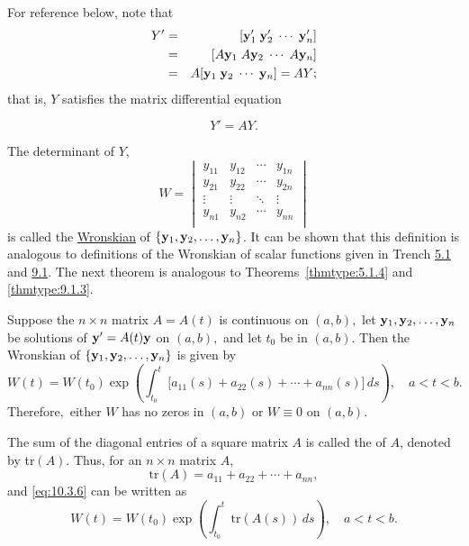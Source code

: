 \documentclass{ximera}
\begin{document}
For reference below, note that
\begin{eqnarray*}
Y'&=&[{\bf y}_1'\; {\bf y}_2'\; \cdots\; {\bf y}_n']\\
&=&[A{\bf y}_1\; A{\bf y}_2\; \cdots\; A{\bf y}_n]\\
&=&A[{\bf y}_1\; {\bf y}_2\; \cdots\; {\bf y}_n]=AY;
\end{eqnarray*}
that is, $Y$ satisfies the matrix differential equation

$$
Y'=AY.
$$

The determinant of $Y$,
\begin{equation} \label{eq:10.3.5}
W=\begin{vmatrix}
y_{11}&y_{12}&\cdots&y_{1n} \\
y_{21}&y_{22}&\cdots&y_{2n}\\
\vdots&\vdots&\ddots&\vdots \\
y_{n1}&y_{n2}&\cdots&y_{nn} \\
\end{vmatrix}
\end{equation}
is called the
\href{http://www-history.mcs.st-and.ac.uk/Mathematicians/Wronski.html}{Wronskian} of $\{{\bf y}_1,{\bf y}_2,\dots,{\bf
y}_n\}$. It can be shown 
that this definition is analogous to definitions of the Wronskian of
scalar functions given in Trench \href{https://ximera.osu.edu/ode/main/homogeneousLinearEquations/homogeneousLinearEquations}{5.1} and \href{https://ximera.osu.edu/ode/main/linearHigherOrder/linearHigherOrder}{9.1}.
The next theorem is analogous to
Theorems~\ref{thmtype:5.1.4} and
\ref{thmtype:9.1.3}. %

\begin{theorem} \label{thmtype:10.3.2}
Suppose the $n\times n$ matrix $A=A(t)$ is continuous on $(a,b),$ let
${\bf y}_1, {\bf y}_2, \dots, {\bf y}_n$ be solutions of ${\bf
y}'=A(t){\bf y}$ on $(a,b),$ and let $t_0$ be in $(a,b)$. Then the
Wronskian of $\{{\bf y}_1,{\bf y}_2,\dots,{\bf y}_n\}$ is given by
\begin{equation} \label{eq:10.3.6}
W(t)=W(t_0)\exp\left(
\int^t_{t_0}\big[a_{11}(s)+a_{22}(s)+\cdots+a_{nn}(s)]\,
ds\right), \quad  a < t < b.
\end{equation}
Therefore$,$  either $W$ has no zeros in  $(a,b)$ or $W\equiv0$
on  $(a,b).$
\end{theorem}

\begin{remark}
The sum of the diagonal entries of a square matrix $A$ is called the
 of $A$, denoted by tr$(A)$. Thus, for an $n\times n$
matrix $A$,
$$
\mbox{tr}(A)=a_{11}+a_{22}+\cdots+a_{nn},
$$
and  \eqref{eq:10.3.6} can be written as
$$
W(t)=W(t_0)\exp\left(
\int^t_{t_0}\mbox{tr}(A(s))\,
ds\right), \quad a < t < b.
$$
\end{remark}
\end{document}
